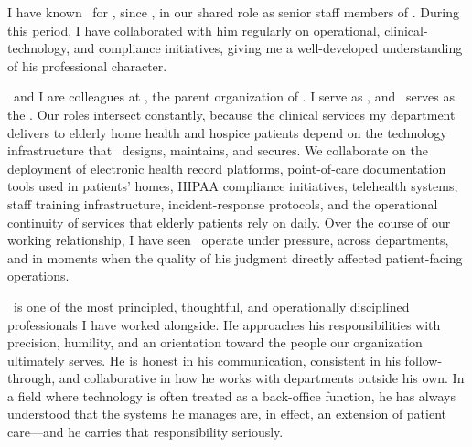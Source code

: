 \resetlicquestions

\licformheader

\licwriterinfo
  {\RefBName}
  {\RefBAddress}
  {\RefBCityStateZip}
  {\RefBPhone}


I have known \ApplicantName\ for \RefBKnownDuration, since \RefBKnownSince, in our shared role as senior staff members of \EmployerName. During this period, I have collaborated with him regularly on operational, clinical-technology, and compliance initiatives, giving me a well-developed understanding of his professional character.


\ApplicantName\ and I are colleagues at \EmployerName, the parent organization of \EmployerDivisions. I serve as \RefBTitle, and \ApplicantName\ serves as the \EmployerRole. Our roles intersect constantly, because the clinical services my department delivers to elderly home health and hospice patients depend on the technology infrastructure that \ApplicantName\ designs, maintains, and secures. We collaborate on the deployment of electronic health record platforms, point-of-care documentation tools used in patients' homes, HIPAA compliance initiatives, telehealth systems, staff training infrastructure, incident-response protocols, and the operational continuity of services that elderly patients rely on daily. Over the course of our working relationship, I have seen \ApplicantName\ operate under pressure, across departments, and in moments when the quality of his judgment directly affected patient-facing operations.


\ApplicantName\ is one of the most principled, thoughtful, and operationally disciplined professionals I have worked alongside. He approaches his responsibilities with precision, humility, and an orientation toward the people our organization ultimately serves. He is honest in his communication, consistent in his follow-through, and collaborative in how he works with departments outside his own. In a field where technology is often treated as a back-office function, he has always understood that the systems he manages are, in effect, an extension of patient care---and he carries that responsibility seriously.


